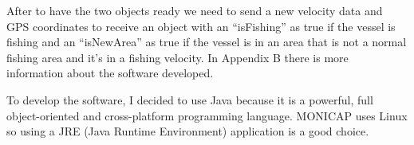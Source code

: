After to have the two objects ready we need to send a new velocity data and GPS coordinates to receive an object with an “isFishing” as true if the vessel is fishing and an “isNewArea” as true if the vessel is in an area that is not a normal fishing area and it’s in a fishing velocity. In Appendix B there is more information about the software developed.

To develop the software, I decided to use Java because it is a powerful, full object-oriented and cross-platform programming language. MONICAP uses Linux so using a JRE (Java Runtime Environment) application is a good choice.








